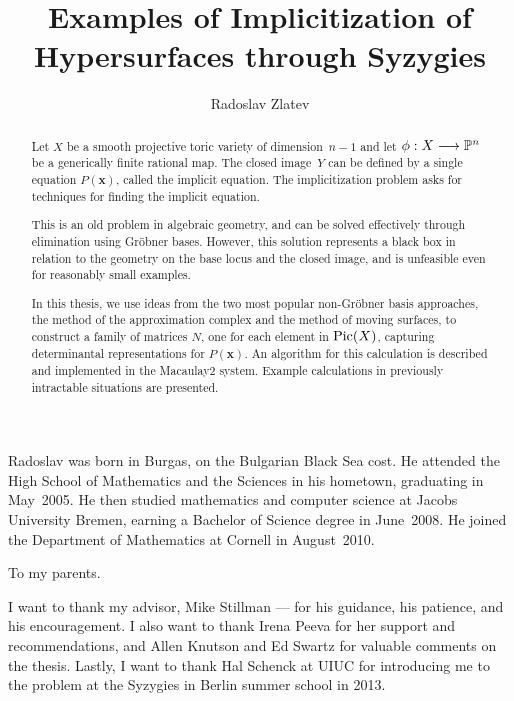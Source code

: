 \documentclass[phd,tocprelim]{cornell}
\title {Examples of Implicitization of Hypersurfaces through Syzygies}
\author {Radoslav Zlatev}
\numberwithin{first}{chapter}
\begin{document}
\maketitle
\makecopyright

\begin{abstract}
Let $X$ be a smooth projective toric variety of dimension~$n-1$
and let $\phi:X\longrightarrow\mathbb{P}^n$ be a generically finite rational map.
The closed image~$Y$ can be defined by a single equation $P(\mathbf x)$,
called the implicit equation.
The implicitization problem asks for techniques for finding the implicit equation.

This is an old problem in algebraic geometry, and can be solved effectively
through elimination using Gr\"obner bases.
However, this solution represents
a black box in relation to the geometry on the base locus and the closed image,
and is unfeasible even for reasonably small examples.

In this thesis, we use ideas from the two most popular non-Gr\"obner basis approaches,
the method of the approximation complex and the method of moving surfaces,
to construct a family of matrices $N$, one for each element in $\operatorname{Pic}(X)$,
capturing determinantal representations for $P(\mathbf x)$.
An algorithm for this calculation is described and implemented in the Macaulay2 system.
Example calculations in previously intractable situations are presented.
\end{abstract}

\begin{biosketch}
Radoslav was born in Burgas, on the Bulgarian Black Sea cost.
He attended the High School of Mathematics and the Sciences in his hometown, graduating in May~2005.
He then studied mathematics and computer science at Jacobs University Bremen,
earning a Bachelor of Science degree in June~2008.
He joined the Department of Mathematics at Cornell in August~2010.
\end{biosketch}

\begin{dedication}
To my parents.
\end{dedication}

\begin{acknowledgements}
I want to thank my advisor, Mike Stillman ---
for his guidance, his patience, and his encouragement.
I also want to thank
Irena Peeva for her support and recommendations, and
Allen Knutson and Ed Swartz for valuable comments on the thesis.
Lastly, I want to thank
Hal Schenck at UIUC  for introducing me to the problem
at the Syzygies in Berlin summer school in 2013.
\end{acknowledgements}
\end{document}
